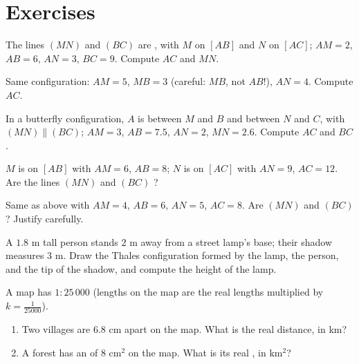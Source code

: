 \section{Exercises}

\begin{exercise}[$\star$]\label{exo:g9:thales:1}
The lines $(MN)$ and $(BC)$ are , with $M$ on $[AB]$ and $N$ on
$[AC]$; $AM = 2$, $AB = 6$, $AN = 3$, $BC = 9$. Compute $AC$ and $MN$.
\end{exercise}

\begin{exercise}[$\star$]\label{exo:g9:thales:2}
Same configuration: $AM = 5$, $MB = 3$ (careful: $MB$, not $AB$!),
$AN = 4$. Compute $AC$.
\end{exercise}

\begin{exercise}[$\star$]\label{exo:g9:thales:3}
In a butterfly configuration, $A$ is between $M$ and $B$ and between $N$
and $C$, with $(MN) \parallel (BC)$; $AM = 3$, $AB = 7.5$, $AN = 2$,
$MN = 2.6$. Compute $AC$ and $BC$.
\end{exercise}

\begin{exercise}[$\star$]\label{exo:g9:thales:4}
$M$ is on $[AB]$ with $AM = 6$, $AB = 8$; $N$ is on $[AC]$ with $AN = 9$,
$AC = 12$. Are the lines $(MN)$ and $(BC)$ ?
\end{exercise}

\begin{exercise}[$\star\star$]\label{exo:g9:thales:5}
Same as above with $AM = 4$, $AB = 6$, $AN = 5$, $AC = 8$. Are $(MN)$
and $(BC)$ ? Justify carefully.
\end{exercise}

\begin{exercise}[$\star\star$]\label{exo:g9:thales:6}
A $1.8$ m tall person stands $2$ m away from a street lamp's base;
their shadow measures $3$ m. Draw the Thales configuration formed by the
lamp, the person, and the tip of the shadow, and compute the height of
the lamp.
\end{exercise}

\begin{exercise}[$\star\star$]\label{exo:g9:thales:7}
A map has  $1 : 25\,000$ (lengths on the map are the real lengths
multiplied by $k = \frac{1}{25000}$).
\begin{enumerate}
  \item Two villages are $6.8$ cm apart on the map. What is the real
        distance, in km?
  \item A forest has an  of $8$ cm$^2$ on the map. What is its real
        , in km$^2$?
\end{enumerate}
\end{exercise}

